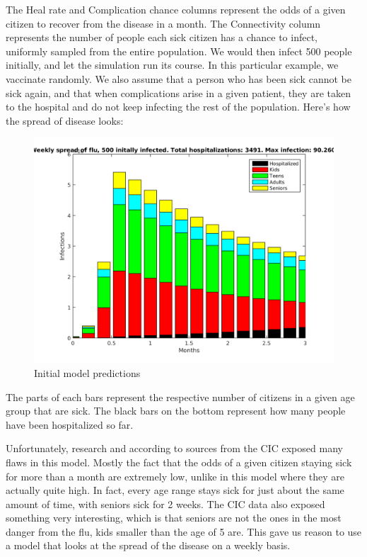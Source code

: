 \documentclass{article}
\begin{document}
\par The Heal rate and Complication chance columns represent the odds of a given citizen to recover from the disease in a month. The Connectivity column represents the number of people each sick citizen has a chance to infect, uniformly sampled from the entire population. We would then infect 500 people initially, and let the simulation run its course. In this particular example, we vaccinate randomly. We also assume that a person who has been sick cannot be sick again, and that when complications arise in a given patient, they are taken to the hospital and do not keep infecting the rest of the population. Here's how the spread of disease looks:
\begin{figure}[h!]
\includegraphics[width=\textwidth]{figures/Naive-model.png}
\caption{Initial model predictions}
\end{figure}
The parts of each bars represent the respective number of citizens in a given age group that are sick. The black bars on the bottom represent how many people have been hospitalized so far.
\par Unfortunately, research and according to sources from the CIC \cite{CIC-stats} \cite{CIC-qa} exposed many flaws in this model. Mostly the fact that the odds of a given citizen staying sick for more than a month are extremely low, unlike in this model where they are actually quite high. In fact, every age range stays sick for just about the same amount of time, with seniors sick for 2 weeks. The CIC data also exposed something very interesting, which is that seniors are not the ones in the most danger from the flu, kids smaller than the age of 5 are. This gave us reason to use a model that looks at the spread of the disease on a weekly basis.
\end{document}
